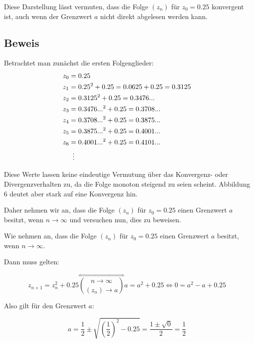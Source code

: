 \documentclass[a4paper, 12pt]{book}
\begin{document}

Diese Darstellung lässt vermuten, dass die Folge
\(\left( z_{n} \right)\) für \(z_{0} = 0.25\) konvergent ist, auch
wenn der Grenzwert \(a\) nicht direkt abgelesen werden kann.

\subsection*{Beweis}

Betrachtet man zunächst die ersten Folgenglieder:
\begin{align*}
z_{0} &= 0.25\\
z_{1} &= {0.25}^{2} + 0.25 = 0.0625 + 0.25 = 0.3125\\
z_{2} &= {0.3125}^{2} + 0.25 = 0.3476...\\
z_{3} &= {0.3476...}^{2} + 0.25 = 0.3708...\\
z_{4} &= {0.3708...}^{2} + 0.25 = 0.3875...\\
z_{5} &= {0.3875...}^{2} + 0.25 = 0.4001...\\
z_{6} &= {0.4001...}^{2} + 0.25 = 0.4101...\\
      &\vdotswithin{=} %
\end{align*}

Diese Werte lassen keine eindeutige Vermutung über das Konvergenz- oder
Divergenzverhalten zu, da die Folge monoton steigend zu seien scheint.
Abbildung 6 deutet aber stark auf eine Konvergenz hin.

Daher nehmen wir an, dass die Folge \(\left( z_{n} \right)\) für
\(z_{0} = 0.25\) einen Grenzwert \(a\) besitzt, wenn
\(n \rightarrow \infty\) und versuchen nun, dies zu beweisen.

Wie nehmen an, dass die Folge \(\left( z_{n} \right)\) für
\(z_{0} = 0.25\) einen Grenzwert \(a\) besitzt, wenn
\(n \rightarrow \infty\).

Dann muss gelten:

\[z_{n + 1} = z_{n}^{2} + 0.25\overset{\Leftrightarrow}{\binom{n \rightarrow \infty}{\left( z_{n} \right) \rightarrow a}}a = a^{2} + 0.25 \Longleftrightarrow 0 = a^{2} - a + 0.25\]

Also gilt für den Grenzwert \(a\):

\[a = \frac{1}{2} \pm \sqrt{\left( \frac{1}{2} \right)^{2} - 0.25} = \frac{1 \pm \sqrt{0}}{2} = \frac{1}{2}\]
\end{document}
